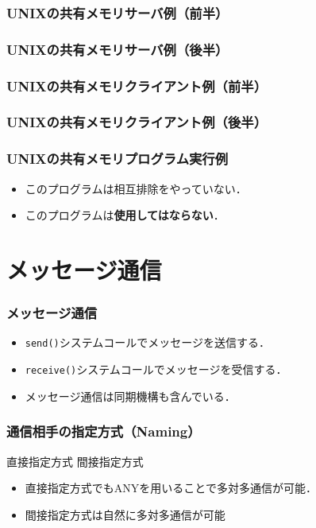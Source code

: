 \documentclass{beamer}                   %
\begin{document}
\begin{frame}
  \frametitle{UNIXの共有メモリサーバ例（前半）}
\end{frame}

\begin{frame}
  \frametitle{UNIXの共有メモリサーバ例（後半）}
\end{frame}

\begin{frame}
  \frametitle{UNIXの共有メモリクライアント例（前半）}
\end{frame}

\begin{frame}
  \frametitle{UNIXの共有メモリクライアント例（後半）}
\end{frame}

\begin{frame}
  \frametitle{UNIXの共有メモリプログラム実行例}
  \begin{itemize}
  \item このプログラムは相互排除をやっていない．
  \item このプログラムは{\bf 使用してはならない}．
  \end{itemize}
\end{frame}

\section{メッセージ通信}
\begin{frame}
  \frametitle{メッセージ通信}
  \begin{itemize}
  \item {\tt send()}システムコールでメッセージを送信する．
  \item {\tt receive()}システムコールでメッセージを受信する．
  \item メッセージ通信は同期機構も含んでいる．
  \end{itemize}
\end{frame}

\begin{frame}
  \frametitle{通信相手の指定方式（Naming）}
  \begin{center}
    直接指定方式
    間接指定方式
  \end{center}
  \begin{itemize}
  \item 直接指定方式でもANYを用いることで多対多通信が可能．
  \item 間接指定方式は自然に多対多通信が可能
  \end{itemize}
\end{frame}
\end{document}
